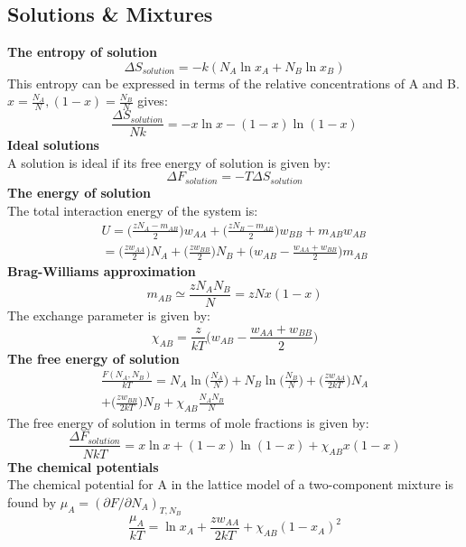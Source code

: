 \documentclass[8pt]{article}
\numberwithin{equation}{section}
\begin{document}
\begin{multicols}{2}
\section{Solutions \& Mixtures}
\textbf{The entropy of solution}
\begin{equation} 
\Delta S_{solution}=-k(N_{A}\ln{x_{A}}+N_{B}\ln{x_{B}}) \tag{15.3}
\end{equation}
This entropy can be expressed in terms of the relative concentrations of A and B. $x=\frac{N_{A}}{N}, (1-x)=\frac{N_{B}}{N}$ gives:
\begin{equation}
\frac{\Delta S_{solution}}{Nk}=-x\ln{x}-(1-x)\ln{(1-x)} \tag{15.4}
\end{equation}
\textbf{Ideal solutions} \\
A solution is ideal if its free energy of solution is given by: 
\begin{equation}
\Delta F_{solution}=-T\Delta S_{solution} \tag{p. 271}
\end{equation}
\textbf{The energy of solution}\\
The total interaction energy of the system is: 
\begin{gather}
U=\bigg(\frac{zN_{A}-m_{AB}}{2}\bigg)w_{AA}+\bigg(\frac{zN_{B}-m_{AB}}{2}\bigg)w_{BB} +m_{AB}w_{AB}  \tag{15.9} \\ =\bigg(\frac{zw_{AA}}{2}\bigg)N_{A}+\bigg(\frac{zw_{BB}}{2}\bigg)N_{B}+\bigg(w_{AB}-\frac{w_{AA}+w_{BB}}{2}\bigg)m_{AB} \tag{15.9}
\end{gather}
\textbf{Brag-Williams approximation}\\ 
\begin{equation}
m_{AB}\simeq \frac{zN_{A}N_{B}}{N}=zNx(1-x) \tag{15.11}
\end{equation}
The exchange parameter is given by: 
\begin{equation}
\chi_{AB}=\frac{z}{kT}\bigg(w_{AB}-\frac{w_{AA}+w_{BB}}{2}\bigg) \tag{15.13}
\end{equation}
\textbf{The free energy of solution} \\
\begin{gather}
\frac{F(N_{A},N_{B})}{kT}=N_{A}\ln{\bigg(\frac{N_{A}}{N} \bigg)}+ N_{B}\ln{\bigg(\frac{N_{B}}{N} \bigg)} +\bigg(\frac{zw_{AA}}{2kT}\bigg)N_{A} \\+\bigg(\frac{zw_{BB}}{2kT}\bigg)N_{B} +\chi_{AB}\frac{N_{A}N_{B}}{N} \tag{15.14}
\end{gather}
The free energy of solution in terms of mole fractions is given by: 
\begin{equation}\tag{15.16}
\frac{\Delta F_{solution}}{NkT}=x\ln{x}+(1-x)\ln{(1-x)}+\chi_{AB}x(1-x)\label{eq:15.16}
\end{equation}
\textbf{The chemical potentials}\\
The chemical potential for A in the lattice model of a two-component mixture is found by $\mu_{A}=(\partial F/\partial N_{A})_{T,N_{B}}$
\begin{equation}
\frac{\mu_{A}}{kT}=\ln{x_{A}}+\frac{zw_{AA}}{2kT}+\chi_{AB}(1-x_{A})^{2} \tag{15.17}
\end{equation} 

\end{multicols}
\end{document}
